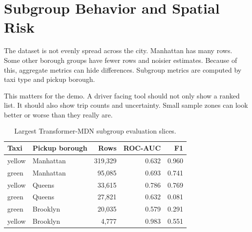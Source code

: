 \documentclass[11pt]{article}
\begin{document}
\section{Subgroup Behavior and Spatial Risk}
The dataset is not evenly spread across the city. Manhattan has many rows. Some other borough groups have fewer rows and noisier estimates. Because of this, aggregate metrics can hide differences. Subgroup metrics are computed by taxi type and pickup borough.

This matters for the demo. A driver facing tool should not only show a ranked list. It should also show trip counts and uncertainty. Small sample zones can look better or worse than they really are.

\begin{table}[H]
\centering
\caption{Largest Transformer-MDN subgroup evaluation slices.}
\begin{tabular}{llrrr}
\toprule
Taxi & Pickup borough & Rows & ROC-AUC & F1 \\
\midrule
yellow & Manhattan & 319,329 & 0.632 & 0.960 \\
green & Manhattan & 95,085 & 0.693 & 0.741 \\
yellow & Queens & 33,615 & 0.786 & 0.769 \\
green & Queens & 27,821 & 0.632 & 0.081 \\
green & Brooklyn & 20,035 & 0.579 & 0.291 \\
yellow & Brooklyn & 4,777 & 0.983 & 0.551 \\
\bottomrule
\end{tabular}
\end{table}

\begin{table}[H]
\centering
\caption{Top final-model pickup zones by expected tip among zones with at least 50 observed test rows.}
\end{table}
\end{document}
